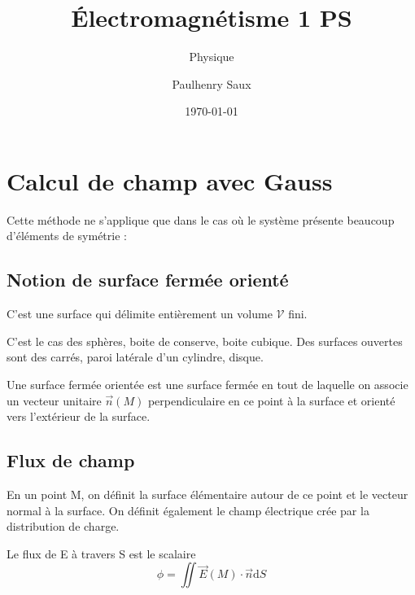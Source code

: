 \documentclass[french]{yLectureNote}
\title{Électromagnétisme 1 PS}
\subtitle{Physique}
\author{Paulhenry Saux}
\date{\today}
\renewcommand{\vec}{\overrightarrow}
\newcommand{\dd}{\mathrm{d}}
\newcommand{\E}{\vec{E}(M)}
\newcommand{\mv}{\mathcal{V}}
\begin{document}
\setcounter{chapter}{4}
\chapter{Calcul de champ avec Gauss}
Cette méthode ne s'applique que dans le cas où le système présente beaucoup d'éléments de symétrie :

\section{Notion de surface fermée orienté}
\begin{definition}
C'est une surface qui délimite entièrement un volume \(\mv\) fini.
\end{definition}
C'est le cas des sphères, boite de conserve, boite cubique. Des surfaces ouvertes sont des carrés, paroi latérale d'un cylindre, disque.

\begin{definition}
Une surface fermée orientée  est une surface fermée en tout de laquelle on associe un vecteur unitaire \(\vec{n}(M)\) perpendiculaire en ce point à la surface et orienté vers l'extérieur de la surface.
\end{definition}
\section{Flux de champ}
En un point M, on définit la surface élémentaire autour de ce point et le vecteur normal à la surface. On définit également le champ électrique crée par la distribution de charge.

\begin{definition}
Le flux de E à travers S est le scalaire \[\phi = \iint \E \cdot \vec{n}\dd S\]
\end{definition}
\end{document}
